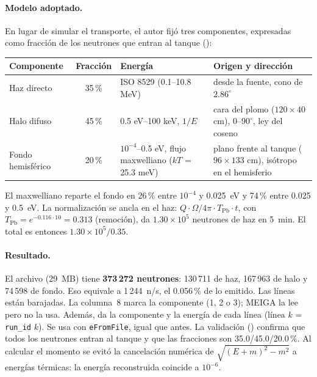 \documentclass[11pt,a4paper]{article}
\begin{document}
\paragraph{Modelo adoptado.} En lugar de simular el transporte, el autor fijó tres componentes,
expresadas como fracción de los neutrones que entran al tanque
():
\begin{center}\small
\begin{tabular}{p{2.2cm}cp{3.4cm}p{6.3cm}}
\toprule
Componente & Fracción & Energía & Origen y dirección \\
\midrule
Haz directo & 35\,\% & ISO 8529 (0.1--10.8 MeV) & desde la fuente, cono de $2.86^\circ$ \\
Halo difuso & 45\,\% & 0.5 eV--100 keV, $1/E$ & cara del plomo ($120\times40$ cm), 0--$90^\circ$, ley del coseno \\
Fondo hemisférico & 20\,\% & $10^{-4}$--0.5 eV, flujo maxwelliano ($kT$ = 25.3 meV) & plano frente al tanque ($96\times133$ cm), isótropo en el hemisferio \\
\bottomrule
\end{tabular}
\end{center}
El maxwelliano reparte el fondo en 26\,\% entre $10^{-4}$ y 0.025~eV y 74\,\% entre 0.025 y 0.5~eV.
La normalización se ancla en el haz: $Q\cdot\Omega/4\pi\cdot T_\text{Pb}\cdot t$, con
$T_\text{Pb}=e^{-0.116\cdot10}=0.313$ (remoción), da $1.30\times10^{5}$ neutrones de haz en 5~min. El total
es entonces $1.30\times10^5/0.35$.

\paragraph{Resultado.} El archivo
(29~MB) tiene \textbf{373\,272 neutrones}: 130\,711 de haz, 167\,963 de halo y 74\,598 de fondo. Eso
equivale a 1\,244~n/s, el 0.056\,\% de lo emitido. Las líneas están barajadas. La columna~8 marca la
componente (1, 2 o 3); MEIGA la lee pero no la usa. Además,  da la componente
y la energía de cada línea (línea $k$ = \texttt{run\_id} $k$). Se usa con \texttt{eFromFile}, igual que
antes. La validación () confirma que todos los
neutrones entran al tanque y que las fracciones son 35.0/45.0/20.0\,\%. Al calcular el momento se evitó
la cancelación numérica de $\sqrt{(E+m)^2-m^2}$ a energías térmicas: la energía reconstruida coincide a
$10^{-6}$.
\end{document}
